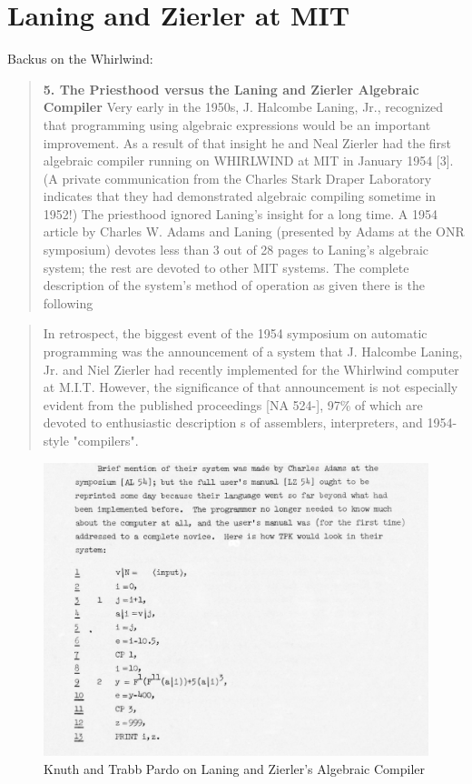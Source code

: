 \section{Laning and Zierler at MIT}
\label{sec:laning-zierler}


Backus on the Whirlwind\cite{Backus_1980_Programming_in_America_in_1950s}:
\begin{quotation}
    \textbf{5. The Priesthood versus the Laning and Zierler Algebraic Compiler}
Very early in the 1950s, J. Halcombe Laning, Jr., recognized that programming using algebraic expressions would be an important improvement.
As a result of that insight he and Neal Zierler had the first algebraic compiler
running on WHIRLWIND at MIT in January 1954 [3]. (A private communication from the Charles Stark Draper Laboratory indicates that they had
demonstrated algebraic compiling sometime in 1952!) The priesthood ignored Laning's insight for a long time. A 1954 article by Charles W. Adams
and Laning (presented by Adams at the ONR symposium) devotes less than
3 out of 28 pages to Laning's algebraic system; the rest are devoted to other
MIT systems. The complete description of the system's method of operation
as given there is the following
\end{quotation}

\begin{quotation}
In retrospect, the biggest event of the 1954 symposium on automatic programming 
was the announcement of a system that J. Halcombe Laning, Jr. and Niel Zierler 
had recently implemented for the Whirlwind computer at M.I.T.  However, the 
significance of that announcement is not especially evident from the published 
proceedings [NA 524-], 97\% of which are devoted to enthusiastic description s 
of assemblers, interpreters, and 1954-style "compilers".
\cite{Knuth_TrabbPardo_1976_Early_Development}
\end{quotation}

\begin{figure}[h!]
    \centering
    \includegraphics[width=0.5\linewidth]{resource/knuth_pardo_on_laning_zierlers_algebraic_compiler.png}
    \caption{Knuth and Trabb Pardo on Laning and Zierler's Algebraic Compiler}
    \label{fig:knuth-pardo-on-laning-zierler}
\end{figure}

